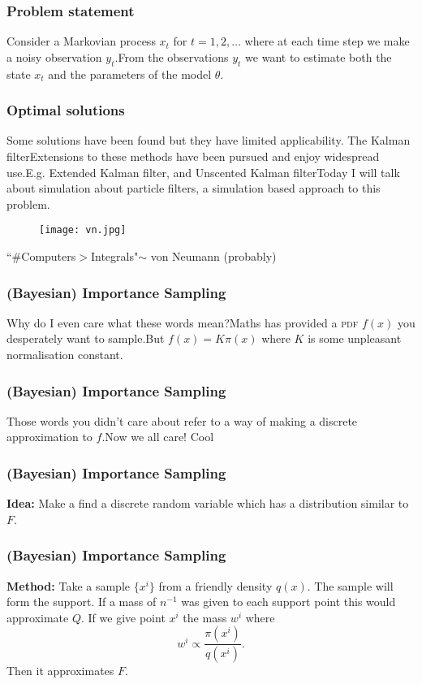 \documentclass{beamer}
\begin{document}
\frame
{
\frametitle{Problem statement}
Consider a Markovian process $x_t$ for $t=1,2,\dots$ where at each time step we make a noisy observation $y_t$.\newline\newline From the observations $y_t$ we want to estimate both the state $x_t$ and the parameters of the model $\theta$.
}

\frame
{
\frametitle{Optimal solutions}
Some solutions have been found but they have limited applicability. The Kalman filter\newline\newline Extensions to these methods have been pursued and enjoy widespread use.\newline\newline E.g. Extended Kalman filter, and Unscented Kalman filter\newline\newline Today I will talk about simulation about particle filters, a simulation based approach to this problem.
}

\frame
{
\begin{figure}[htb]
\texttt{[image: vn.jpg]}
\end{figure}
``\#Computers$>$Integrals"$\sim$ von Neumann (probably)
}

\frame
{
\frametitle{(Bayesian) Importance Sampling}
Why do I even care what these words mean?\newline\newline Maths has provided a \textsc{pdf} $f(x)$ you desperately want to sample.\newline\newline But $f(x) = K\pi(x)$ where $K$ is some unpleasant normalisation constant.
}

\frame
{
\frametitle{(Bayesian) Importance Sampling}
Those words you didn't care about refer to a way of making a discrete approximation to $f$.\newline\newline Now we all care! Cool
}

\frame
{
\frametitle{(Bayesian) Importance Sampling}
\textbf{Idea:} Make a find a discrete random variable which has a distribution similar to $F$.
}


\frame
{
\frametitle{(Bayesian) Importance Sampling}
\textbf{Method:} Take a sample $\{x^i\}$ from a friendly density $q(x)$. The sample will form the support. If a mass of $n^{-1}$ was given to each support point this would approximate $Q$. If we give point $x^i$ the mass $w^i$ where
\begin{equation}
w^i\propto \frac{\pi(x^i)}{q(x^i)}.
\end{equation}
Then it approximates $F$.
}
\end{document}
